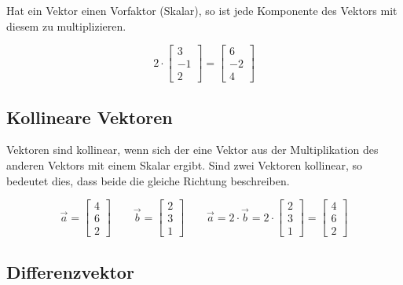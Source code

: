 Hat ein Vektor einen Vorfaktor (Skalar), so ist jede Komponente
des Vektors mit diesem zu multiplizieren.

\begin{equation*}
    2 \cdot
    \begin{bmatrix}
        3 \\
        -1 \\
        2
    \end{bmatrix}
    =
    \begin{bmatrix}
        6 \\
        -2 \\
        4
    \end{bmatrix}
\end{equation*}

\subsection{Kollineare Vektoren}

Vektoren sind kollinear, wenn sich der eine Vektor aus der Multiplikation
des anderen Vektors mit einem Skalar ergibt.
Sind zwei Vektoren kollinear, so bedeutet dies, dass beide die gleiche
Richtung beschreiben.

\begin{equation*}
    \overrightarrow{a} =
    \begin{bmatrix}
        4 \\
        6 \\
        2
    \end{bmatrix}
    \qquad
    \overrightarrow{b} =
    \begin{bmatrix}
        2 \\
        3 \\
        1
    \end{bmatrix}
    \qquad
    \overrightarrow{a} =
    2 \cdot \overrightarrow{b} =
    2 \cdot
    \begin{bmatrix}
        2 \\
        3 \\
        1
    \end{bmatrix}
    =
    \begin{bmatrix}
        4 \\
        6 \\
        2
    \end{bmatrix}
\end{equation*}

\subsection{Differenzvektor}



